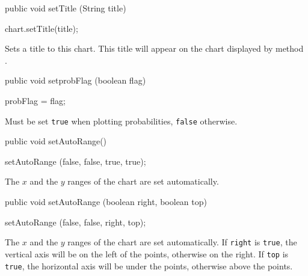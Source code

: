 \begin{code}

   public void setTitle (String title) \begin{hide} {
      chart.setTitle(title);
   }\end{hide}
\end{code}
\begin{tabb}
   Sets a title to this chart. This title will appear on the chart displayed
 by method .
\end{tabb}
\begin{htmlonly}
\end{htmlonly}
\begin{code}

   public void setprobFlag (boolean flag) \begin{hide} {
      probFlag = flag;
   }\end{hide}
\end{code}
\begin{tabb}
   Must be set \texttt{true} when plotting probabilities,
  \texttt{false} otherwise.
\end{tabb}
\begin{htmlonly}
\end{htmlonly}
\begin{code}

   public void setAutoRange() \begin{hide} {
      setAutoRange (false, false, true, true);
   }\end{hide}
\end{code}
\begin{tabb}
   The $x$ and the $y$ ranges of the chart are set automatically.
\end{tabb}
\begin{code}

   public void setAutoRange (boolean right, boolean top) \begin{hide} {
      setAutoRange (false, false, right, top);
   }\end{hide}
\end{code}
\begin{tabb}
   The $x$ and the $y$ ranges of the chart are set automatically.
 If \texttt{right} is \texttt{true}, the vertical axis will be on the left of
 the points, otherwise on the right. If \texttt{top} is \texttt{true},
 the horizontal axis  will be under the points, otherwise above the points.
\end{tabb}

